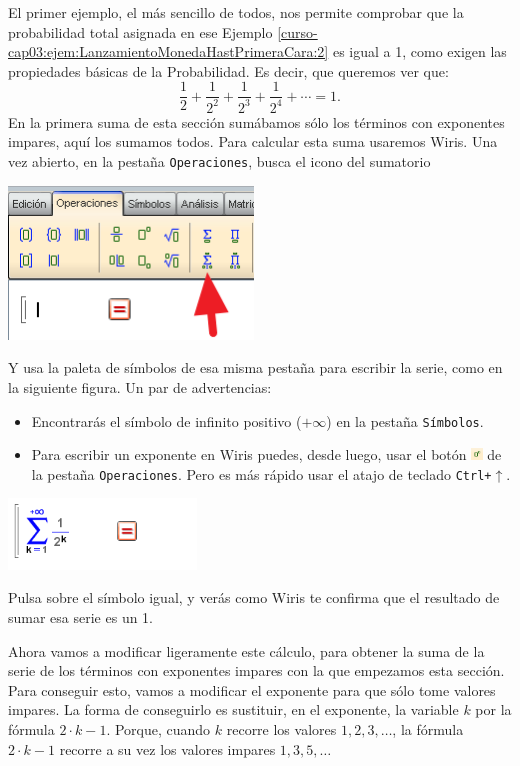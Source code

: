 \documentclass[10pt,a4paper]{article}\usepackage[]{graphicx}\usepackage[]{color}
\newcounter {cont01}
\begin{document}
El primer ejemplo, el más sencillo de todos, nos permite comprobar que la probabilidad total asignada en ese Ejemplo \ref{curso-cap03:ejem:LanzamientoMonedaHastPrimeraCara:2} es igual a 1, como exigen las propiedades básicas de la Probabilidad. Es decir, que queremos ver que:
\[ \dfrac{1}{2}+\dfrac{1}{2^2}+\dfrac{1}{2^3}+\dfrac{1}{2^4}+\cdots=1. \]
En la primera suma de esta sección sumábamos sólo los términos con exponentes impares, aquí los sumamos todos. Para calcular esta suma usaremos Wiris. Una vez abierto, en la pestaña {\tt Operaciones}, busca el icono del sumatorio
    \begin{center}
    \includegraphics[width=6.5cm]{../fig/Tut05-02.png}
    \end{center}
Y usa la paleta de símbolos de esa misma pestaña para escribir la serie, como en la siguiente figura. Un par de advertencias:
\begin{itemize}
  \item Encontrarás el símbolo de infinito positivo ($+\infty$) en la pestaña {\tt Símbolos}.
  \item Para escribir un exponente en Wiris puedes, desde luego, usar el botón \includegraphics[width=0.3cm]{../fig/Tut05-03.png} de la pestaña {\tt Operaciones}. Pero es más rápido usar el atajo de teclado {\tt Ctrl+$\uparrow$}.
\end{itemize}
    \begin{center}
    \includegraphics[width=5cm]{../fig/Tut05-04.png}
    \end{center}
Pulsa sobre el símbolo igual, y verás como Wiris te confirma que el resultado de sumar esa serie es un 1.

Ahora vamos a modificar ligeramente este cálculo, para obtener la suma de la serie de los términos con exponentes impares con la que empezamos esta sección. Para conseguir esto, vamos a modificar el exponente para que sólo tome valores impares. La forma de conseguirlo es sustituir, en el exponente, la variable $k$ por la fórmula $2\cdot k-1$. Porque, cuando $k$ recorre los valores $1,2,3,\ldots$, la fórmula $2\cdot k-1$ recorre a su vez los valores impares $1,3,5,\ldots$
\end{document}
